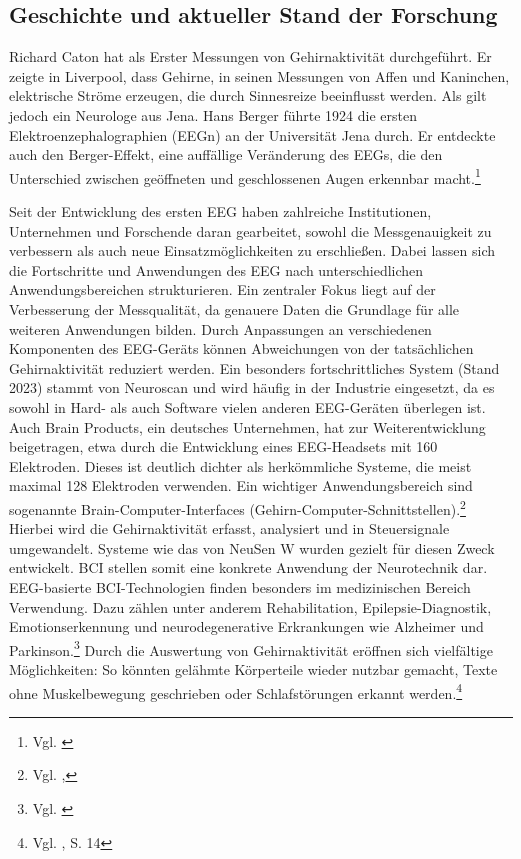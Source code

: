 \subsection{Geschichte und aktueller Stand der Forschung}
Richard Caton hat als Erster Messungen von Gehirnaktivität durchgeführt. Er zeigte in Liverpool, dass Gehirne, in seinen Messungen von Affen und Kaninchen, elektrische Ströme erzeugen, die durch Sinnesreize beeinflusst werden. Als  gilt jedoch ein Neurologe aus Jena. Hans Berger führte 1924 die ersten Elektroenzephalographien (EEGn) an der Universität Jena durch. Er entdeckte auch den Berger-Effekt, eine auffällige Veränderung des EEGs, die den Unterschied zwischen geöffneten und geschlossenen Augen erkennbar macht.\footnote{Vgl. \cite{wiki_eeg}}

Seit der Entwicklung des ersten EEG haben zahlreiche Institutionen, Unternehmen und Forschende daran gearbeitet, sowohl die Messgenauigkeit zu verbessern als auch neue Einsatzmöglichkeiten zu erschließen. Dabei lassen sich die Fortschritte und Anwendungen des EEG nach unterschiedlichen Anwendungsbereichen strukturieren.\newline
 Ein zentraler Fokus liegt auf der Verbesserung der Messqualität, da genauere Daten die Grundlage für alle weiteren Anwendungen bilden. Durch Anpassungen an verschiedenen Komponenten des EEG-Geräts können Abweichungen von der tatsächlichen Gehirnaktivität reduziert werden. Ein besonders fortschrittliches System (Stand 2023) stammt von Neuroscan und wird häufig in der Industrie eingesetzt, da es sowohl in Hard- als auch Software vielen anderen EEG-Geräten überlegen ist. Auch Brain Products, ein deutsches Unternehmen, hat zur Weiterentwicklung beigetragen, etwa durch die Entwicklung eines EEG-Headsets mit 160 Elektroden. Dieses ist deutlich dichter als herkömmliche Systeme, die meist maximal 128 Elektroden verwenden.\newline
 Ein wichtiger Anwendungsbereich sind sogenannte Brain-Computer-Interfaces (Gehirn-Computer-Schnittstellen).\footnote{Vgl. \cite{wiki_bci},} Hierbei wird die Gehirnaktivität erfasst, analysiert und in Steuersignale umgewandelt. Systeme wie das von NeuSen W wurden gezielt für diesen Zweck entwickelt. BCI stellen somit eine konkrete Anwendung der Neurotechnik dar.
 EEG-basierte BCI-Technologien finden besonders im medizinischen Bereich Verwendung. Dazu zählen unter anderem Rehabilitation, Epilepsie-Diagnostik, Emotionserkennung und neurodegenerative Erkrankungen wie Alzheimer und Parkinson.\footnote{Vgl. \cite{wiki_neurodegenerativ}} Durch die Auswertung von Gehirnaktivität eröffnen sich vielfältige Möglichkeiten: So könnten gelähmte Körperteile wieder nutzbar gemacht, Texte ohne Muskelbewegung geschrieben oder Schlafstörungen erkannt werden.\footnote{Vgl. \cite{liu2025}, S. 14} \newline
